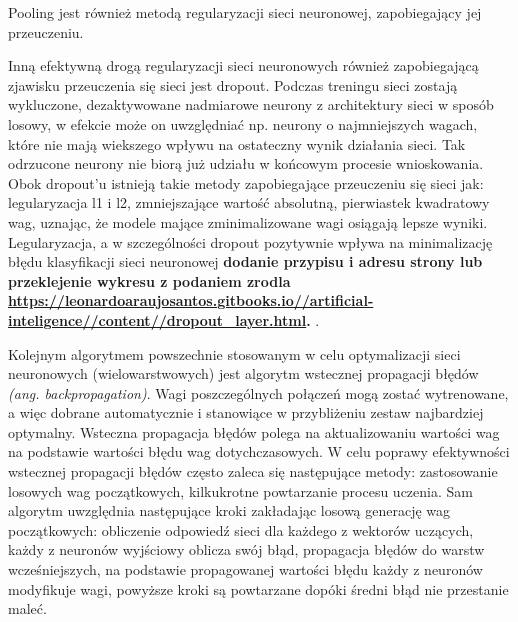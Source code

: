 \documentclass[a4paper,12pt]{article}
\begin{document}
			Pooling jest również metodą regularyzacji sieci neuronowej, zapobiegający jej przeuczeniu. 
        
        \par Inną efektywną drogą regularyzacji sieci neuronowych również zapobiegającą zjawisku przeuczenia się sieci jest dropout. 
			Podczas treningu sieci zostają wykluczone, dezaktywowane nadmiarowe neurony z architektury sieci w sposób losowy, 
			w efekcie może on uwzględniać np. neurony o najmniejszych wagach, które nie mają wiekszego wpływu na ostateczny wynik działania sieci. 
			Tak odrzucone neurony nie biorą już udziału w końcowym procesie wnioskowania. Obok dropout'u istnieją takie metody zapobiegające 
			przeuczeniu się sieci jak: legularyzacja l1 i l2, zmniejszające wartość absolutną, pierwiastek kwadratowy wag, uznając, że modele mające 
			zminimalizowane wagi osiągają lepsze wyniki. Legularyzacja, a w szczególności dropout pozytywnie wpływa na minimalizację błędu 
			klasyfikacji sieci neuronowej \textbf{dodanie przypisu i adresu strony lub przeklejenie wykresu z podaniem zrodla \href{https://leonardoaraujosantos.gitbooks.io//artificial-inteligence//content//dropout_layer.html}{\url{https://leonardoaraujosantos.gitbooks.io//artificial-inteligence//content//dropout_layer.html}}.
        }. 
        
			Kolejnym algorytmem powszechnie stosowanym w celu optymalizacji sieci neuronowych (wielowarstwowych) jest algorytm wstecznej propagacji błędów 
			\textit{(ang. backpropagation)}. Wagi poszczególnych połączeń mogą zostać wytrenowane, a więc dobrane automatycznie i stanowiące 
			w przybliżeniu zestaw najbardziej optymalny. Wsteczna propagacja błędów polega na aktualizowaniu wartości wag na podstawie wartości błędu 
			wag dotychczasowych. W celu poprawy efektywności wstecznej propagacji błędów często zaleca się następujące metody: 
			zastosowanie losowych wag początkowych, kilkukrotne powtarzanie procesu uczenia. Sam algorytm uwzględnia następujące kroki 
			zakładając losową generację wag początkowych: obliczenie odpowiedź sieci dla każdego z wektorów uczących, 
			każdy z neuronów wyjściowy oblicza swój błąd, propagacja błędów do warstw wcześniejszych, na podstawie propagowanej wartości 
			błędu każdy z neuronów modyfikuje wagi, powyższe kroki są powtarzane dopóki średni błąd nie przestanie maleć.
\end{document}
